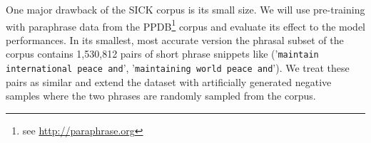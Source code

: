 One major drawback of the SICK corpus is its small size. We will use pre-training with paraphrase data from the PPDB\footnote{see \url{http://paraphrase.org}} corpus \autocite{ganitkevitch_ppdb_2013} and evaluate its effect to the model performances. In its smallest, most accurate version the phrasal subset of the corpus contains 1,530,812 pairs of short phrase snippets like ('\texttt{maintain international peace and}', '\texttt{maintaining world peace and}'). We treat these pairs as similar and extend the dataset with artificially generated negative samples where the two phrases are randomly sampled from the corpus.

